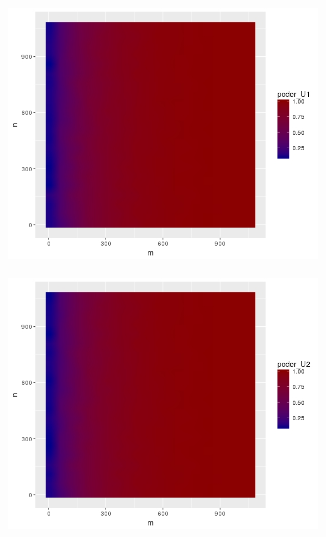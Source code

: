 \documentclass[%
 reprint,
 amsmath,amssymb,
 aps,
spanish]{revtex4-1}
\begin{document}
\begin{figure}[t]
    \centering
    \begin{subfigure}[t]{0.45\textwidth}
      \centering
      \includegraphics[width=0.9\textwidth]{imagenes/poder_U1_01}
    \end{subfigure}
    \begin{subfigure}[t]{0.45\textwidth}
      \centering
      \includegraphics[width=0.9\textwidth]{imagenes/poder_U2_01}
    \end{subfigure}
    \begin{subfigure}[t]{0.45\textwidth}
      \centering

\end{subfigure}
\end{figure}
\end{document}
